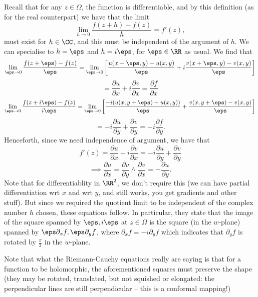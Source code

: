 Recall that for any $z\in\Omega$, the function is differentiable, and by this
definition (as for the real counterpart) we have that the limit
\[\lim_{h\to 0}\frac{f(z+h)-f(z)}{h} =f'(z),\]
must exist for $h\in\CC$, and this must be independent of the argument of $h$.
We can specialise to $h=\eps$ and $h=i\eps$, for $\eps\in\RR$ as usual. We find
that 
\[\lim_{\eps\to 0} \frac{f(z+\eps)-f(z)}{\eps} = \lim_{\eps\to 0}\left[ 
    \frac{u(x+\eps, y) - u(x,y)}{\eps} + i \frac{v(x+\eps,y)-v(x,y)}{\eps}
\right]\]
\[=\frac{\partial u}{\partial x} + i\frac{\partial v}{\partial x} =
\frac{\partial f}{\partial x} \]
\[\lim_{\eps\to 0} \frac{f(z+i\eps)-f(z)}{i\eps} = \lim_{\eps\to 0}\left[ 
    \frac{-i(u(x, y+\eps) - u(x,y))}{\eps} +  \frac{v(x,y+\eps)-v(x,y)}{\eps}
\right]\]
\[=-i\frac{\partial u}{\partial y} + \frac{\partial v}{\partial y} =
-i\frac{\partial f}{\partial y}.\]
Henceforth, since we need independence of argument, we have that
\[f'(z)=\frac{\partial u}{\partial x} + i\frac{\partial v}{\partial x} = -i\frac{\partial u}{\partial y} + \frac{\partial v}{\partial y}\]
\[\implies \frac{\partial u}{\partial x} = \frac{\partial v}{\partial y}\land
\frac{\partial v}{\partial x} = -\frac{\partial u}{\partial y}.\]
Note that for differentiablity in $\RR^2$, we don't require this (we can have
  partial differentiation wrt $x$ and wrt $y$, and still works, you get
gradients and other stuff). But since we required the quotient limit to be
independent of the complex number $h$ chosen, these equations follow. In
particular, they state that the image of the square spanned by $\eps, i\eps$ at
$z\in\Omega$ is the square (in the $w$-plane) spanned by $\eps \partial_x f,
\eps \partial_y f$, where $\partial_x f=-i \partial_y f$ which indicates that
$\partial_y f$ is rotated by $\frac{\pi}{2}$ in the $w$-plane.
\begin{remark}
  Note that what the Riemann-Cauchy equations really are saying is that for a
  function to be holomorphic, the aforementioned squares must preserve the shape
  (they may be rotated, translated, but not squished or elongated: the
  perpendicular lines are still perpendicular -- this is a conformal mapping!)
\end{remark}

